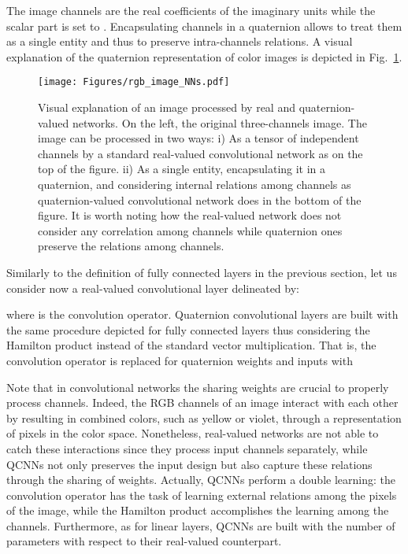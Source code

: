 \documentclass[graybox]{svmult}
\begin{document}
\noindent The image channels are the real coefficients of the imaginary units while the scalar part is set to . Encapsulating channels in a quaternion allows to treat them as a single entity and thus to preserve intra-channels relations. A visual explanation of the quaternion representation of color images is depicted in Fig.~\ref{fig:rgb_images}.

\begin{figure}
\centering
    \texttt{[image: Figures/rgb\_image\_NNs.pdf]}
\caption{Visual explanation of an  image processed by real and quaternion-valued networks. On the left, the original three-channels image. The image can be processed in two ways: i) As a tensor of independent channels by a standard real-valued convolutional network as on the top of the figure. ii) As a single entity, encapsulating it in a quaternion, and considering internal relations among channels as quaternion-valued convolutional network does in the bottom of the figure. It is worth noting how the real-valued network does not consider any correlation among channels while quaternion ones preserve the relations among channels.}
    \label{fig:rgb_images}
\end{figure}

Similarly to the definition of fully connected layers in the previous section, let us consider now a real-valued convolutional layer delineated by:



\noindent where  is the convolution operator.
Quaternion convolutional layers are built with the same procedure depicted for fully connected layers thus considering the Hamilton product instead of the standard vector multiplication. That is, the convolution operator  is replaced for quaternion weights and inputs with



\noindent Note that in convolutional networks the sharing weights are crucial to properly process channels. Indeed, the RGB channels of an image interact with each other by resulting in combined colors, such as yellow or violet, through a representation of pixels in the color space. Nonetheless, real-valued networks are not able to catch these interactions since they process input channels separately, while QCNNs not only preserves the input design but also capture these relations through the sharing of weights.
Actually, QCNNs perform a double learning: the convolution operator has the task of learning external relations among the pixels of the image, while the Hamilton product accomplishes the learning among the channels.
Furthermore, as for linear layers, QCNNs are built with  the number of parameters with respect to their real-valued counterpart.
\end{document}
